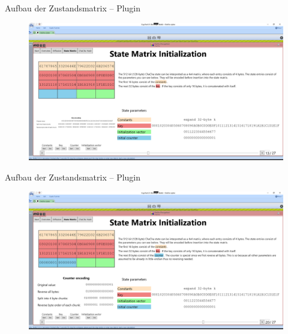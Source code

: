 \documentclass{beamer}
\begin{document}
\begin{frame}{Aufbau der Zustandsmatrix -- Plugin}
\begin{figure}
\center
\begin{minipage}{\textwidth}
\includegraphics[width=\textwidth]{figures/state-matrix/2-state-matrix-key.png}
\end{minipage}
\end{figure}
\end{frame}

\begin{frame}{Aufbau der Zustandsmatrix -- Plugin}
\begin{figure}
\center
\begin{minipage}{\textwidth}
\includegraphics[width=\textwidth]{figures/state-matrix/3-state-matrix-counter.png}
\end{minipage}
\end{figure}
\end{frame}
\end{document}

